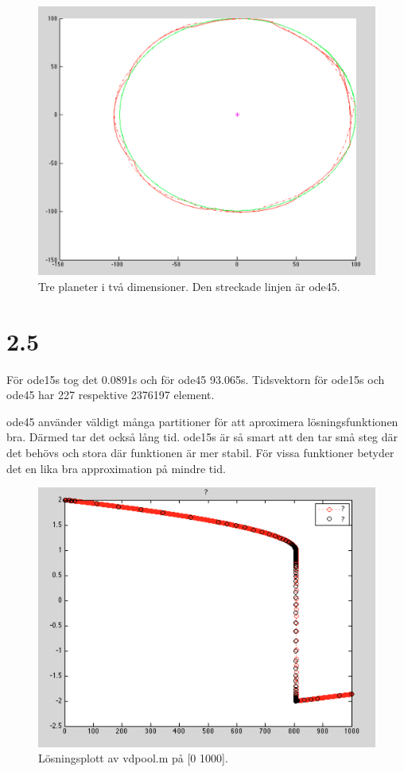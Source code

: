 \documentclass[a4paper,10pt]{article}
\begin{document}
    \begin{figure}
        \includegraphics[width=\textwidth]{celest3.png}
        \caption{Tre planeter i två dimensioner. Den streckade linjen är ode45.}
    \end{figure}

    \section*{2.5}
    För ode15s tog det 0.0891s och för ode45 93.065s.
    Tidsvektorn för ode15s och ode45 har 227 respektive 2376197 element.

    ode45 använder väldigt många partitioner för att aproximera lösningsfunktionen
    bra. Därmed tar det också lång tid.
    ode15s är så smart att den tar små steg där det behövs och stora där funktionen är mer stabil. För vissa funktioner betyder det en lika bra approximation på mindre tid.
    \begin{figure}
        \includegraphics[width=\textwidth]{vdpool1000.png}
        \caption{Lösningsplott av vdpool.m på [0 1000].}
    \end{figure}
\end{document}
